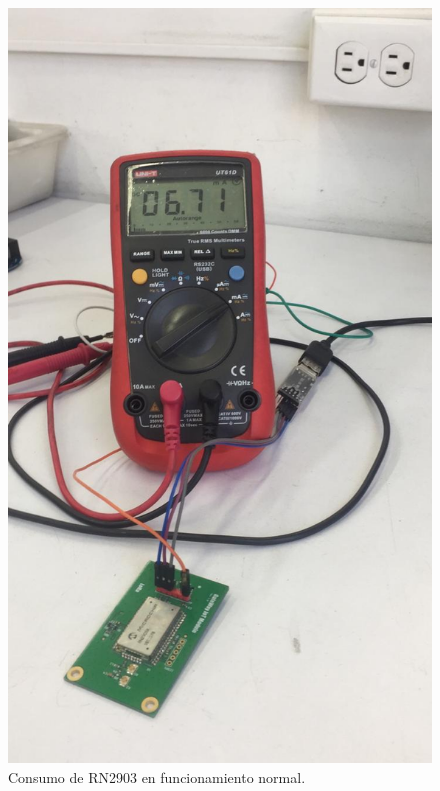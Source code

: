 \begin{figure}[H]
	\centering
	\includegraphics[scale=.15]{./Figures/ConsumoLoraNormal.jpeg}
	\caption{Consumo de RN2903 en funcionamiento normal.}
	\label{fig:ConsumoLoraNormal}
\end{figure}

